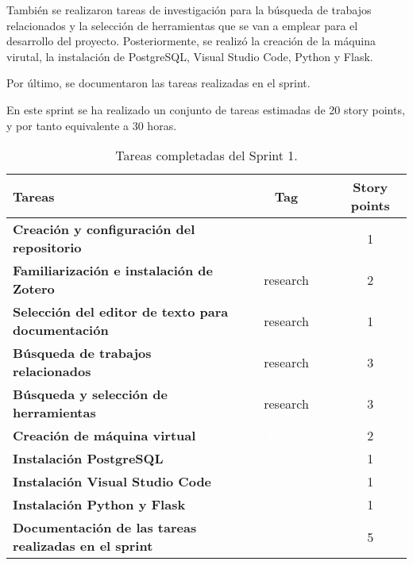 También se realizaron tareas de investigación para la búsqueda de trabajos relacionados y la selección de herramientas que se van a emplear para el desarrollo del proyecto.
Posteriormente, se realizó la creación de la máquina virutal, la instalación de PostgreSQL, Visual Studio Code, Python y Flask.

Por último, se documentaron las tareas realizadas en el sprint.

En este sprint se ha realizado un conjunto de tareas estimadas de 20 story points, y por tanto equivalente a 30 horas.

\begin{table}[ht!]
    \centering
    \resizebox{15cm}{!} {
    \begin{tabular}{|l|c|c|}
    \hline
    \rowcolor[rgb]{0.99,0.93,0.93}
    \textbf{Tareas}     &\textbf{Tag}     & \textbf{Story points} \\ \hline
    \textbf{Creación y configuración del repositorio}         &\cellcolor[rgb]{0.93,0.35,0.0}\textcolor{white}{configuration}      &1 \\ \hline 
    \textbf{Familiarización e instalación de Zotero}         &\cellcolor[rgb]{0.6,1.0,0.6}research      &2 \\ \hline
    \textbf{Selección del editor de texto para documentación}         &\cellcolor[rgb]{0.6,1.0,0.6}research      &1 \\ \hline 
    \textbf{Búsqueda de trabajos relacionados}         &\cellcolor[rgb]{0.6,1.0,0.6}research      &3 \\ \hline 
    \textbf{Búsqueda y selección de herramientas}          &\cellcolor[rgb]{0.6,1.0,0.6}research      &3 \\ \hline 
    \textbf{Creación de máquina virtual}         &\cellcolor[rgb]{0.93,0.35,0.0}\textcolor{white}{configuration}      &2 \\ \hline 
    \textbf{Instalación PostgreSQL}         &\cellcolor[rgb]{0.93,0.75,0.0}\textcolor{white}{install}      &1 \\ \hline 
    \textbf{Instalación Visual Studio Code}         &\cellcolor[rgb]{0.93,0.75,0.0}\textcolor{white}{install}      &1 \\ \hline 
    \textbf{Instalación Python y Flask}         &\cellcolor[rgb]{0.93,0.75,0.0}\textcolor{white}{install}      &1 \\ \hline 
    \textbf{Documentación de las tareas realizadas en el sprint}         &\cellcolor[rgb]{0.0,0.33,0.71}\textcolor{white}{documentation}      &5 \\ \hline 
    \end{tabular}}
    \caption{Tareas completadas del Sprint 1.}
    \label{tab:my_label}
\end{table}

